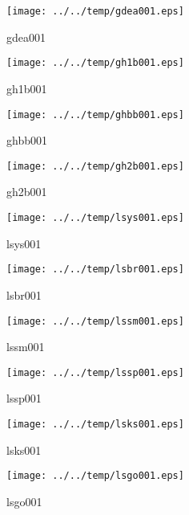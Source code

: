 \documentclass[a4paper,twoside,11pt]{article}
\makeatletter
\def\maxwidth{%
  \ifdim\Gin@nat@width>\linewidth
    \linewidth
  \else
    \Gin@nat@width
  \fi
}
\makeatother
\begin{document}
\clearpage
\begin{figure}
  \centering
  \texttt{[image: ../../temp/gdea001.eps]}
  \caption{gdea001}
  \label{fig:gdea001}
\end{figure}

\begin{figure}
  \centering
  \texttt{[image: ../../temp/gh1b001.eps]}
  \caption{gh1b001}
  \label{fig:gh1b001}
\end{figure}

\clearpage
\begin{figure}
  \centering
  \texttt{[image: ../../temp/ghbb001.eps]}
  \caption{ghbb001}
  \label{fig:ghbb001}
\end{figure}

\begin{figure}
  \centering
  \texttt{[image: ../../temp/gh2b001.eps]}
  \caption{gh2b001}
  \label{fig:gh2b001}
\end{figure}

\clearpage
\begin{figure}
  \centering
  \texttt{[image: ../../temp/lsys001.eps]}
  \caption{lsys001}
  \label{fig:lsys001}
\end{figure}

\begin{figure}
  \centering
  \texttt{[image: ../../temp/lsbr001.eps]}
  \caption{lsbr001}
  \label{fig:lsbr001}
\end{figure}

\clearpage
\begin{figure}
  \centering
  \texttt{[image: ../../temp/lssm001.eps]}
  \caption{lssm001}
  \label{fig:lssm001}
\end{figure}

\begin{figure}
  \centering
  \texttt{[image: ../../temp/lssp001.eps]}
  \caption{lssp001}
  \label{fig:lssp001}
\end{figure}

\clearpage
\begin{figure}
  \centering
  \texttt{[image: ../../temp/lsks001.eps]}
  \caption{lsks001}
  \label{fig:lsks001}
\end{figure}

\begin{figure}
  \centering
  \texttt{[image: ../../temp/lsgo001.eps]}
  \caption{lsgo001}
  \label{fig:lsgo001}
\end{figure}
\end{document}
